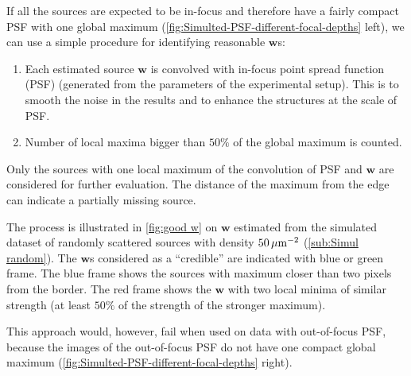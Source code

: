 %
If all the sources are expected to be in-focus and therefore have a fairly compact PSF with one global maximum (\autoref{fig:Simulted-PSF-different-focal-depths} left), we can use a simple procedure for identifying reasonable $\bm{w}$s:
%
\begin{enumerate}
	\item
	Each estimated source $\bm{w}$ is convolved with in-focus point spread function (PSF) (generated from the parameters of the experimental setup). This is to smooth the noise in the results and to enhance the structures at the scale of PSF. 
	\item
	Number of local maxima bigger than $50\%$ of the global maximum is counted. 
\end{enumerate}

Only the sources with one local maximum of the convolution of PSF and $\bm{w}$ are considered for further evaluation. The distance of the maximum from the edge can indicate a partially missing source. 

The process is illustrated in \autoref{fig:good w} on $\bm{w}$ estimated from the simulated dataset of randomly scattered sources with density $50\, \mathrm{\mu m}^{-2}$ (\autoref{sub:Simul random}). The $\bm{w}$s considered as a ``credible'' are indicated with blue or green frame. The blue frame shows the sources with maximum closer than two pixels from the border. The red frame shows the $\bm{w}$ with two local minima of similar strength (at least $50\%$ of the strength of the stronger maximum).

This approach would, however, fail when used on data with out-of-focus PSF, because the images of the out-of-focus PSF do not have one compact global maximum (\autoref{fig:Simulted-PSF-different-focal-depths} right).


